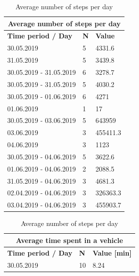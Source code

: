 \begin{table}[]
	\parbox{.45\linewidth}{
		\centering
		\begin{tabular}{|l|l|l|}
			\hline
			\multicolumn{3}{|c|}{\textbf{Average number of steps per day}}     \\ \hline
			\textbf{Time period / Day} & \textbf{N} & \textbf{Value}           \\ \hline
			30.05.2019                 & 5          & 4331.6                   \\ \hline
			31.05.2019                 & 5          & 3439.8                   \\ \hline
			30.05.2019 - 31.05.2019    & 6          & 3278.7                   \\ \hline
			30.05.2019 - 31.05.2019    & 5          & 4030.2                   \\ \hline
			30.05.2019 - 01.06.2019    & 6          & 4271                     \\ \hline
			01.06.2019                 & 1          & 17                       \\ \hline
			30.05.2019 - 03.06.2019    & 5          & 643959                   \\ \hline
			03.06.2019                 & 3          & 455411.3                 \\ \hline
			04.06.2019                 & 3          & 1123                     \\ \hline
			30.05.2019 - 04.06.2019    & 5          & 3622.6                   \\ \hline
			01.06.2019 - 04.06.2019    & 2          & 2088.5                   \\ \hline
			31.05.2019 - 04.06.2019    & 3          & 4681.3                   \\ \hline
			02.04.2019 - 04.06.2019    & 3          & 326363.3                 \\ \hline
			03.04.2019 - 04.06.2019    & 3          & 455903.7                 \\ \hline
		\end{tabular}
		\caption{Average number of steps per day}
		\label{results-steps}
	}
	\hfill
	\parbox{.45\linewidth}{
		\begin{tabular}{|l|l|l|}
			\hline
			\multicolumn{3}{|c|}{\textbf{Average time spent in a vehicle}}     \\ \hline
			\textbf{Time period / Day} & \textbf{N} & \textbf{Value {[}min{]}} \\ \hline
			30.05.2019                 & 10         & 8.24                     \\ \hline

\end{tabular}}
\end{table}
